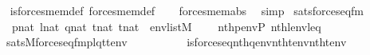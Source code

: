 \begin{isabellebody}
%
\isadelimproof
\ \ %
\endisadelimproof
%
\isatagproof
{}\isamarkupfalse%
\ is{\isacharunderscore}{\kern0pt}forces{\isacharunderscore}{\kern0pt}mem{\isacharunderscore}{\kern0pt}def\ forces{\isacharunderscore}{\kern0pt}mem{\isacharunderscore}{\kern0pt}def\isanewline
\ \ \isamarkupfalse%
\ forces{\isacharunderscore}{\kern0pt}mem{\isacharprime}{\kern0pt}{\isacharunderscore}{\kern0pt}abs\ \isamarkupfalse%
\ simp%
\endisatagproof
{\isafoldproof}%
%
\isadelimproof
\isanewline
%
\endisadelimproof
\isanewline
{}\isamarkupfalse%
\ sats{\isacharunderscore}{\kern0pt}forces{\isacharunderscore}{\kern0pt}eq{\isacharunderscore}{\kern0pt}fm{\isacharcolon}{\kern0pt}\isanewline
\ \ \ \ {\isachardoublequoteopen}p{\isasymin}nat{\isachardoublequoteclose}\ {\isachardoublequoteopen}l{\isasymin}nat{\isachardoublequoteclose}\ {\isachardoublequoteopen}q{\isasymin}nat{\isachardoublequoteclose}\ {\isachardoublequoteopen}t{}{\isasymin}nat{\isachardoublequoteclose}\ {\isachardoublequoteopen}t{}{\isasymin}nat{\isachardoublequoteclose}\ \ {\isachardoublequoteopen}env{\isasymin}list{\isacharparenleft}{\kern0pt}M{\isacharparenright}{\kern0pt}{\isachardoublequoteclose}\isanewline
\ \ \ \ {\isachardoublequoteopen}nth{\isacharparenleft}{\kern0pt}p{\isacharcomma}{\kern0pt}env{\isacharparenright}{\kern0pt}{\isacharequal}{\kern0pt}P{\isachardoublequoteclose}\ {\isachardoublequoteopen}nth{\isacharparenleft}{\kern0pt}l{\isacharcomma}{\kern0pt}env{\isacharparenright}{\kern0pt}{\isacharequal}{\kern0pt}leq{\isachardoublequoteclose}\isanewline
\ \ \ {\isachardoublequoteopen}sats{\isacharparenleft}{\kern0pt}M{\isacharcomma}{\kern0pt}forces{\isacharunderscore}{\kern0pt}eq{\isacharunderscore}{\kern0pt}fm{\isacharparenleft}{\kern0pt}p{\isacharcomma}{\kern0pt}l{\isacharcomma}{\kern0pt}q{\isacharcomma}{\kern0pt}t{}{\isacharcomma}{\kern0pt}t{}{\isacharparenright}{\kern0pt}{\isacharcomma}{\kern0pt}env{\isacharparenright}{\kern0pt}\ {\isasymlongleftrightarrow}\isanewline
\ \ \ \ \ \ \ \ \ is{\isacharunderscore}{\kern0pt}forces{\isacharunderscore}{\kern0pt}eq{\isacharparenleft}{\kern0pt}nth{\isacharparenleft}{\kern0pt}q{\isacharcomma}{\kern0pt}env{\isacharparenright}{\kern0pt}{\isacharcomma}{\kern0pt}nth{\isacharparenleft}{\kern0pt}t{}{\isacharcomma}{\kern0pt}env{\isacharparenright}{\kern0pt}{\isacharcomma}{\kern0pt}nth{\isacharparenleft}{\kern0pt}t{}{\isacharcomma}{\kern0pt}env{\isacharparenright}{\kern0pt}{\isacharparenright}{\kern0pt}{\isachardoublequoteclose}\isanewline

\end{isabellebody}
